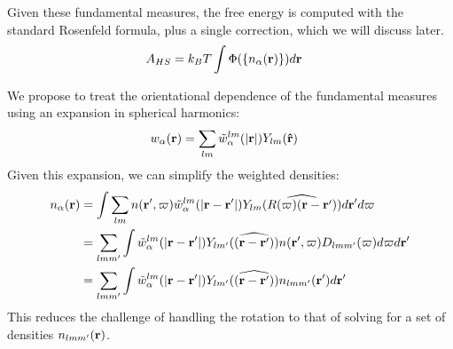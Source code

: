 \documentclass[letterpaper,twocolumn,amsmath,amssymb,pre]{revtex4-1}
\begin{document}
Given these fundamental measures, the free energy is computed with
the standard Rosenfeld formula, plus a single correction, which we
will discuss later.
\begin{align}
  A_{HS} &= k_BT \int \Phi(\{n_\alpha(\mathbf{r})\}) d\mathbf{r}
\end{align}

We propose to treat the orientational dependence of the fundamental
measures using an expansion in spherical harmonics:
\begin{align}
  w_\alpha(\mathbf{r}) &= \sum_{lm} \tilde{w}_\alpha^{lm}(|\mathbf{r}|) Y_{lm}(\mathbf{\hat{r}})
\end{align}
Given this expansion, we can simplify the weighted densities:
\begin{align}
  n_\alpha(\mathbf{r}) &= \int \sum_{lm} n(\mathbf{r}',\mathbf{\varpi})
  \tilde{w}_\alpha^{lm}(|\mathbf{r}-\mathbf{r}'|)
  Y_{lm}(\widehat{R(\mathbf{\varpi})(\mathbf{r}-\mathbf{r}')}) d\mathbf{r}' d\mathbf{\varpi}
  \\
  &= \sum_{lmm'} \int \tilde{w}_\alpha^{lm}(|\mathbf{r}-\mathbf{r}'|)
  Y_{lm'}(\widehat{(\mathbf{r}-\mathbf{r}')})
  n(\mathbf{r}',\mathbf{\varpi})
       D_{lmm'}(\mathbf{\varpi}) d\mathbf{\varpi} d\mathbf{r}'
       \\
  &=
    \sum_{lmm'} \int \tilde{w}_\alpha^{lm}(|\mathbf{r}-\mathbf{r}'|)
    Y_{lm'}(\widehat{(\mathbf{r}-\mathbf{r}')})
    n_{lmm'}(\mathbf{r}') d\mathbf{r}'
\end{align}
This reduces the challenge of handling the rotation to that of solving
for a set of densities $n_{lmm'}(\mathbf{r})$.
\end{document}
